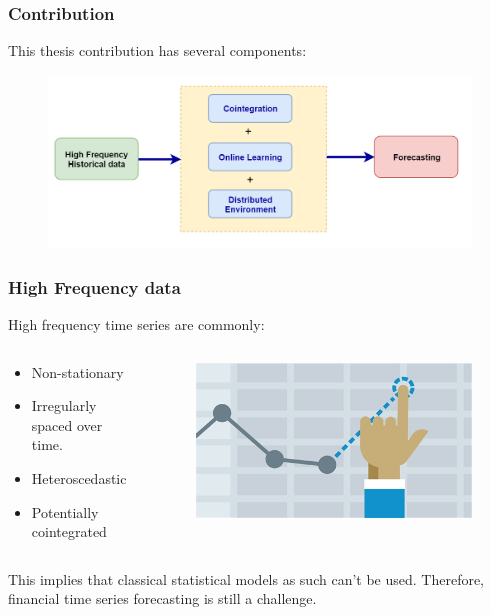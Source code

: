 \documentclass{beamer}
\begin{document}
\begin{frame}
\frametitle{Contribution}
This thesis contribution has several components:
\begin{figure}
\includegraphics[width=\textwidth]{img/contribution}
\end{figure}
\end{frame}


\begin{frame}
\frametitle{High Frequency data}
High frequency time series are commonly:
\begin{columns}
\begin{column}{0.5\textwidth}
\begin{itemize}
\item Non-stationary
\item Irregularly spaced over time.
\item Heteroscedastic
\item Potentially cointegrated
\end{itemize}
\end{column}
\begin{column}{0.5\textwidth}
\begin{figure}
\includegraphics[width=0.35\paperwidth]{img/forecast}
\end{figure}
\end{column}
\end{columns}
\vspace{5mm}
This implies that classical statistical models as such can't be used. Therefore, financial time series forecasting is still a challenge.
\end{frame}
\end{document}
